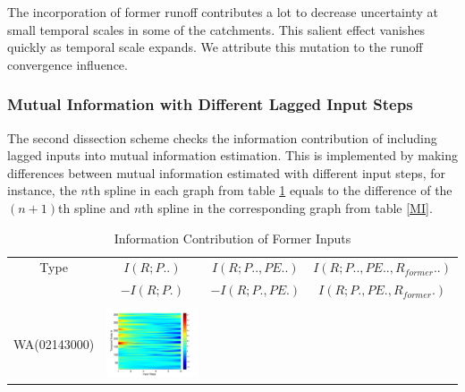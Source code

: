 \documentclass[draft,wrr]{AGUTeX}
\begin{document}
\begin{article}
The incorporation of former runoff contributes a lot to decrease uncertainty at small temporal scales in some of the catchments. This salient effect vanishes quickly as temporal scale expands. We attribute this  mutation to the runoff convergence influence.     
 
\subsubsection{Mutual Information with Different Lagged Input Steps}
The second dissection scheme checks the information contribution of including lagged inputs into mutual information estimation. This is implemented by making differences between mutual information estimated with different input steps, for instance, the $n$th spline in each graph from table \ref{former}  equals to the difference of the   $(n+1)$th spline and  $n$th spline in the corresponding graph from table \ref{MI}.
\begin{table}[H]\small
\caption{Information Contribution of Former Inputs}
\label{former}
\centering
\begin{tabular}{cccc}
\hline
Type&$I(R;P..)$&$I(R;P..,PE..) $&$I(R;P..,PE..,R_{former}..)$\\
 &$ -I(R;P.)$ &$ -I(R;P.,PE.)$&$I(R;P.,PE.,R_{former}.)$\\\hline
\\
WA(02143000)
&\begin{minipage}{.3\textwidth}\includegraphics[width=\linewidth]{resultgraph/02143000pdiff_former.png}\end{minipage}

\end{tabular}
\end{table}
\end{article}
\end{document}
